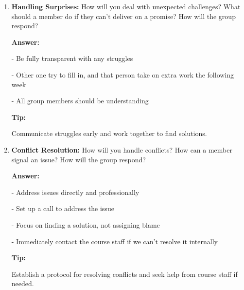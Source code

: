 \documentclass[12pt]{article}
\newenvironment{answer}[1][]{
  \color{blue}\textbf{Answer:}
}{}
\newenvironment{alice}[1][]{
  \color{black}\textbf{Tip:}
}{}
\begin{document}
\begin{enumerate}
\begin{alice}
Communicate struggles early and work together to find solutions.
\end{alice}

\item {\bf Handling Surprises:} How will you deal with unexpected challenges? What should a member do if they can't deliver on a promise? How will the group respond?

\begin{answer}

- Be fully transparent with any struggles

- Other one try to fill in, and that person take on extra work the following week

- All group members should be understanding
\end{answer}

\begin{alice}

Communicate struggles early and work together to find solutions.
\end{alice}

\item {\bf Conflict Resolution:} How will you handle conflicts? How can a member signal an issue? How will the group respond?

\begin{answer}

- Address issues directly and professionally

- Set up a call to address the issue

- Focus on finding a solution, not assigning blame

- Immediately contact the course staff if we can't resolve it internally
\end{answer}

\begin{alice}

Establish a protocol for resolving conflicts and seek help from course staff if needed.
\end{alice}

\end{enumerate}
\end{document}
